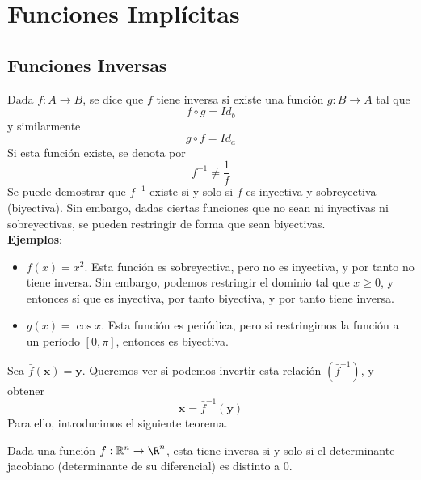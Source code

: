 \documentclass{../Calculo.tex}
\begin{document}
\chapter{Funciones Implícitas}
\section{Funciones Inversas}
Dada $f: A \to B$, se dice que $f$ tiene inversa si existe una función $g: B \to A$ tal que
\[
	f\circ g = Id_{b}
\]
y similarmente
\[
	g \circ f = Id_{a}
\]
Si esta función existe, se denota por
\[
	f^{-1} \neq \frac{1}{f}
\]
Se puede demostrar que $f^{-1}$ existe si y solo si $f$ es inyectiva y sobreyectiva (biyectiva). Sin embargo, dadas ciertas funciones que no sean ni inyectivas ni sobreyectivas, se pueden restringir de forma que sean biyectivas.\\
\textbf{Ejemplos}:
\begin{itemize}
	\item $f(x)=x ^{2}$. Esta función es sobreyectiva, pero no es inyectiva, y por tanto no tiene inversa. Sin embargo, podemos restringir el dominio tal que $x\geq 0$, y entonces sí que es inyectiva, por tanto biyectiva, y por tanto tiene inversa.
	\item $g(x)=\cos x$. Esta función es periódica, pero si restringimos la función a un período $[0, \pi]$, entonces es biyectiva.  
\end{itemize}
Sea $\bar{f}(\mathbf{x}) = \mathbf{y}$. Queremos ver si podemos invertir esta relación $(\bar{f}^{-1})$, y obtener
\[
	\mathbf{x} = \bar{f}^{-1}(\mathbf{y})
\]
Para ello, introducimos el siguiente teorema.
\begin{teorema}
	Dada una función $f:\mathbb{R}^{n} \to \R^{n}$, esta tiene inversa si y solo si el determinante jacobiano (determinante de su diferencial) es distinto a $0$.  
\end{teorema}
\end{document}
